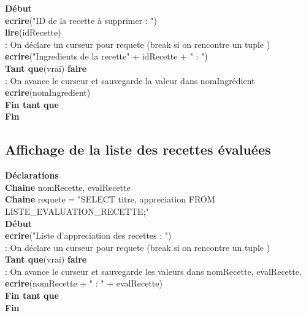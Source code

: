 \documentclass[a4paper,10pt]{report}
\begin{document}
\textbf{Début}\\
	\indent\indent \textbf{ecrire}("ID de la recette à supprimer : ")\\
	\indent\indent \textbf{lire}(idRecette)\\
	\indent\indent {} : On déclare un curseur pour requete (break si on rencontre un tuple )\\
	\indent\indent \textbf{ecrire}("Ingredients de la recette" + idRecette + " : ")\\
	\indent\indent\textbf{Tant que}(vrai) \textbf{faire}\\
		\indent\indent\indent {} : On avance le curseur et sauvegarde la valeur dans nomIngrédient	\\
		\indent\indent\indent \textbf{ecrire}(nomIngredient)\\
	\indent\indent\textbf{Fin tant que}\\
\indent\textbf{Fin}\\


\subsection{Affichage de la liste des recettes évaluées}

\textbf{Déclarations}\\
	\indent\indent\textbf{Chaine} nomRecette, evalRecette \\
	\indent\indent\textbf{Chaine} requete = "SELECT titre, appreciation FROM LISTE\_EVALUATION\_RECETTE;"\\
	
\textbf{Début}\\
	\indent\indent \textbf{ecrire}("Liste d'appreciation des recettes : ")\\
	\indent\indent {} : On déclare un curseur pour requete (break si on rencontre un tuple )\\
	\indent\indent\textbf{Tant que}(vrai) \textbf{faire}\\
		\indent\indent\indent {} : On avance le curseur et sauvegarde les valeurs dans nomRecette, evalRecette.	\\
		\indent\indent\indent \textbf{ecrire}(nomRecette + " : " + evalRecette)\\
	\indent\indent\textbf{Fin tant que}\\
\indent\textbf{Fin}\\
\end{document}
